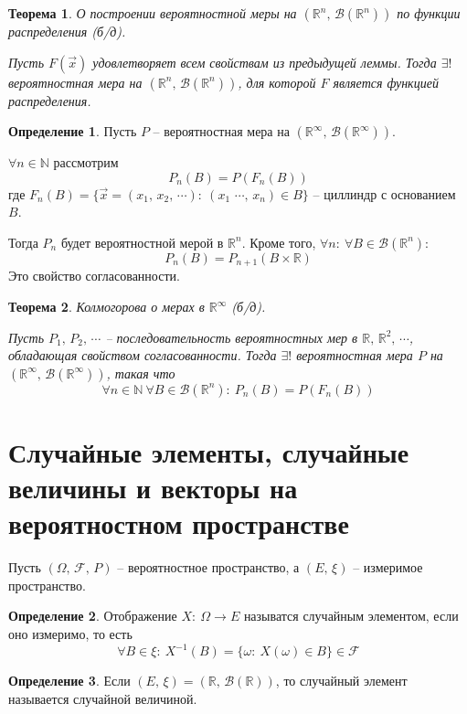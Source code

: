 \documentclass[a4paper,12pt]{article}
\theoremstyle{plain}
\newtheorem{theorem}{Теорема}[section]
\theoremstyle{definition}
\newtheorem{definition}{Определение}[section]
\theoremstyle{remark}
\begin{document}
\begin{theorem}
  О построении вероятностной меры на $(\mathbb{R}^n,\, \mathcal{B}(\mathbb{R}^n))$ по функции распределения (б/д).

  Пусть $F(\vec{x})$ удовлетворяет всем свойствам из предыдущей леммы. Тогда $\exists!$ вероятностная мера на $(\mathbb{R}^n,\, \mathcal{B}(\mathbb{R}^n))$, для которой $F$ является функцией распределения.
\end{theorem}

\begin{definition}
  Пусть $P$ -- вероятностная мера на $(\mathbb{R}^\infty,\, \mathcal{B}(\mathbb{R}^\infty))$.

  $\forall n \in \mathbb{N}$ рассмотрим
  \[P_n(B) = P(F_n(B))\]
  где $F_n(B) = \{\vec{x} = (x_1,\,x_2,\,\cdots) :\: (x_1\,\,\cdots,\,x_n) \in B\}$ -- циллиндр с основанием $B$.

  Тогда $P_n$ будет вероятностной мерой в $\mathbb{R}^n$. Кроме того, $\forall n :\: \forall B \in \mathcal{B}(\mathbb{R}^n)$:
  \[P_n(B) = P_{n + 1}(B \times \mathbb{R})\]
  Это свойство согласованности.
\end{definition}

\begin{theorem}
  Колмогорова о мерах в $\mathbb{R}^\infty$ (б/д).

  Пусть $P_1,\,P_2,\,\cdots$ -- последовательность вероятностных мер в $\mathbb{R},\,\mathbb{R}^2,\,\cdots$, обладающая свойством согласованности.
  Тогда $\exists!$ вероятностная мера $P$ на $(\mathbb{R}^\infty,\,\mathcal{B}(\mathbb{R}^\infty))$, такая что 
  \[\forall n \in \mathbb{N} \: \forall B \in \mathcal{B}(\mathbb{R}^n):\: P_n(B) = P(F_n(B))\]
\end{theorem}

\section{Случайные элементы, случайные величины и векторы на вероятностном пространстве}
Пусть $(\Omega,\, \mathcal{F},\, P)$ -- вероятностное пространство, а $(E,\, \xi)$ -- измеримое пространство.

\begin{definition}
  Отображение $X:\: \Omega \to E$ называтся случайным элементом, если оно измеримо, то есть
  \[\forall B \in \xi:\: X^{-1}(B) = \{\omega :\: X(\omega) \in B\} \in \mathcal{F}\]
\end{definition}

\begin{definition}
  Если $(E,\, \xi) = (\mathbb{R},\, \mathcal{B}(\mathbb{R}))$, то случайный элемент называется случайной величиной.
\end{definition}
\end{document}

